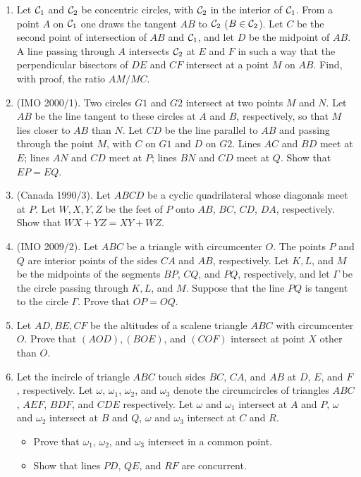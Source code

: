\documentclass[12pt]{scrartcl}
\begin{document}
\begin{enumerate}
    \item Let ${\cal C}_1$ and ${\cal C}_2$ be concentric circles, with ${\cal C}_2$ in the interior of ${\cal C}_1$. From a point $A$ on ${\cal C}_1$ one draws the tangent $AB$ to ${\cal C}_2$ ($B\in {\cal C}_2$). Let $C$ be the second point of intersection of $AB$ and ${\cal C}_1$, and let $D$ be the midpoint of $AB$. A line passing through $A$ intersects ${\cal C}_2$ at $E$ and $F$ in such a way that the perpendicular bisectors of $DE$ and $CF$ intersect at a point $M$ on $AB$. Find, with proof, the ratio $AM/MC$.
    
    \item (IMO 2000/1). Two circles $G1$ and $G2$ intersect at two points $M$ and $N$. Let $AB$ be the line tangent to these circles at $A$ and $B$, respectively, so that $M$ lies closer to $AB$ than $N$. Let $CD$ be the line parallel to $AB$ and passing through the point $M$, with $C$ on $G1$ and $D$ on $G2$. Lines $AC$ and $BD$ meet at $E$; lines $AN$ and $CD$ meet at $P$; lines $BN$ and $CD$ meet at $Q$. Show that $EP = EQ$.
    
    \item (Canada 1990/3). Let $ABCD$ be a cyclic quadrilateral whose diagonals meet at $P$. Let $W, X, Y , Z$ be the feet of $P$ onto $AB$, $BC$, $CD$, $DA$, respectively. Show that $WX + YZ = XY + WZ$.
    
    \item (IMO 2009/2). Let $ABC$ be a triangle with circumcenter $O$. The points $P$ and $Q$ are interior points of the sides $CA$ and $AB$, respectively. Let $K, L$, and $M$ be the midpoints of the segments $BP$, $CQ$, and $PQ$, respectively, and let $\Gamma$ be the circle passing through $K, L$, and $M$. Suppose that the line $PQ$ is tangent to the circle $\Gamma$. Prove that $OP = OQ$.
    
    \item Let $AD, BE, CF$ be the altitudes of a scalene triangle $ABC$ with circumcenter $O$. Prove that $(AOD), (BOE)$, and $(COF)$ intersect at point $X$ other than $O$.
    
    \item Let the incircle of triangle $ABC$ touch sides $BC$, $CA$, and $AB$ at $D$, $E$, and $F$, respectively. Let $\omega$, $\omega_1$, $\omega_2$, and $\omega_3$ denote the circumcircles of triangles $ABC$, $AEF$, $BDF$, and $CDE$ respectively. Let $\omega$ and $\omega_1$ intersect at $A$ and $P$, $\omega$ and $\omega_2$ intersect at $B$ and $Q$, $\omega$ and $\omega_3$ intersect at $C$ and $R$.
    \begin{itemize}[(a)]
        \item Prove that $\omega_1$, $\omega_2$, and $\omega_3$ intersect in a common point.
        \item Show that lines $PD$, $QE$, and $RF$ are concurrent.
    \end{itemize}
    

\end{enumerate}
\end{document}

